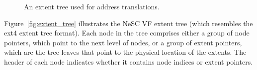 \begin{figure}[t]
  \centering

      \caption{An extent tree used for address translations.\label{fig:extent}}

\end{figure}

Figure~\ref{fig:extent_tree} illustrates the NeSC VF extent tree (which resembles the ext4 extent tree format). Each node in the tree comprises either a group of node pointers, which point to the next level of nodes, or a group of extent pointers, which are the tree leaves that point to the physical location of the extents. The header of each node indicates whether it contains node indices or extent pointers.


